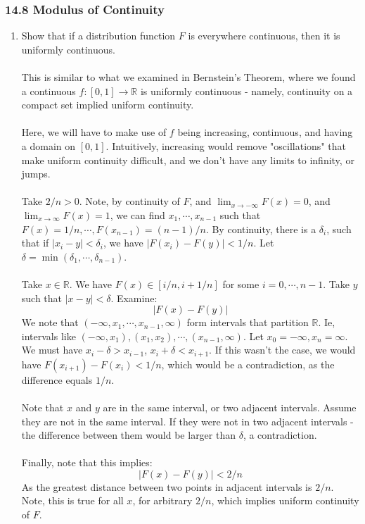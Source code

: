 \documentclass[12pt,a4paper]{article}
\newcommand{\1}[1]{\mathbbm{1}\left\{ #1 \right\}}
\newcommand{\R}{\mathbb{R}}
\begin{document}
\subsubsection{14.8 Modulus of Continuity}
\begin{enumerate}
	\item Show that if a distribution function $F$ is everywhere continuous, then it is uniformly continuous.
	\\\\
	This is similar to what we examined in Bernstein's Theorem, where we found a continuous $f: [0,1] \to \R$ is uniformly continuous - namely, continuity on a compact set implied uniform continuity.
	\\\\
	Here, we will have to make use of $f$ being increasing, continuous, and having a domain on $[0,1]$. Intuitively, increasing would remove "oscillations" that make uniform continuity difficult, and we don't have any limits to infinity, or jumps.
	\\\\
	Take $2/n > 0$. Note, by continuity of $F$, and $\lim_{x \to -\infty} F(x) = 0$, and $\lim_{x \to \infty} F(x) = 1$, we can find $x_1, \cdots, x_{n - 1}$ such that $F(x) = 1/n, \cdots, F(x_{n-1}) = (n-1)/n$. By continuity, there is a $\delta_i$, such that if $|x_i - y| < \delta_i$, we have $|F(x_i) - F(y)| < 1/n$. Let $\delta = \min(\delta_1, \cdots, \delta_{n-1})$.
	\\\\
	Take $x \in \R$. We have $F(x) \in [i/n,i+1/n]$ for some $i = 0, \cdots, n-1$. Take $y$ such that $|x - y| < \delta$. Examine:
	$$
		|F(x) - F(y)|
	$$
	We note that $(-\infty, x_1, \cdots, x_{n-1}, \infty)$ form intervals that partition $\R$. Ie, intervals like $(-\infty,x_1), (x_1, x_2), \cdots, (x_{n-1},\infty)$. Let $x_0 = -\infty, x_n = \infty$. We must have $x_i - \delta > x_{i-1}$, $x_i + \delta < x_{i+1}$. If this wasn't the case, we would have $F(x_{i+1}) - F(x_i) < 1/n$, which would be a contradiction, as the difference equals $1/n$.
	\\\\
	Note that $x$ and $y$ are in the same interval, or two adjacent intervals. Assume they are not in the same interval. If they were not in two adjacent intervals - the difference between them would be larger than $\delta$, a contradiction.
	\\\\
	Finally, note that this implies:
	$$
		|F(x) - F(y)| < 2/n
	$$
	As the greatest distance between two points in adjacent intervals is $2/n$. Note, this is true for all $x$, for arbitrary $2/n$, which implies uniform continuity of $F$.
	

\end{enumerate}
\end{document}
